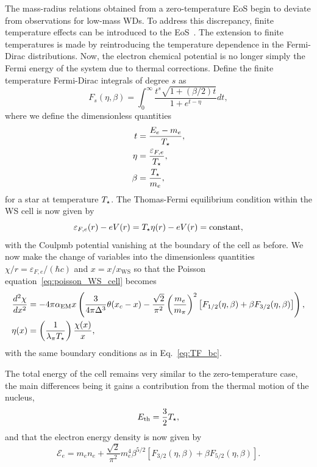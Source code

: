 The mass-radius relations obtained from a zero-temperature EoS begin to deviate from observations for low-mass WDs. 
To address this discrepancy, finite temperature effects can be introduced to the EoS~\cite{deCarvalho:2013rea_Relativisticfeynmanmetropolistellertreatment}. 
The extension to finite temperatures is made by reintroducing the temperature dependence in the Fermi-Dirac
distributions. Now, the electron chemical potential is no longer simply the Fermi energy of the system due to thermal corrections. Define the finite temperature Fermi-Dirac integrals of degree $s$ as
\begin{equation}
    F_s (\eta, \beta) = \int_0^\infty \frac{t^s\sqrt{1 + (\beta/2)t}}{1 + e^{t - \eta}}dt,
\end{equation}
where we define the dimensionless quantities 
\begin{align}
    t & = \frac{E_e - m_e}{T_\star},\\
    \eta & = \frac{\varepsilon_{F,e}}{T_\star},\\
    \beta & = \frac{T_\star}{m_e},
\end{align}
for a star at temperature $T_\star$. The Thomas-Fermi equilibrium condition within the WS cell is now given by 
\begin{equation}
    \varepsilon_{F,e}(r) - e V(r) = T_\star \eta(r) - e V(r) = \mathrm{constant},
\end{equation}
with the Coulpmb potential vanishing at the boundary of the cell as before. We now make the change of variables into the dimensionless quantities $\chi/r = \varepsilon_{F,e} / (\hbar c)$ and $x = x/x_\mathrm{WS}$ so that the Poisson equation~\ref{eq:poisson_WS_cell} becomes
\begin{align}
    \frac{d^2 \chi}{dx^2} &= -4 \pi \alpha_\mathrm{EM} x \left( \frac{3}{4\pi \Delta^3} \theta(x_c - x) - \frac{\sqrt{2}}{\pi^2} \left( \frac{m_e}{m_\pi} \right)^2\left[ F_{1/2}(\eta, \beta) + \beta  F_{3/2}(\eta, \beta) \right] \right),\\
    \eta(x) & = \left(\frac{1}{\lambda_\pi T_\star}\right)\frac{\chi(x)}{x},
\end{align}
with the same boundary conditions as in Eq.~\ref{eq:TF_bc}.

The total energy of the cell remains very similar to the zero-temperature case, the main differences being it gains a contribution from the thermal motion of the nucleus, 
\begin{equation}
    E_\mathrm{th} = \frac{3}{2}T_\star,
\end{equation} 
and that the electron energy density is now given by
\begin{equation}
    \mathcal{E}_e = m_e n_e + \frac{\sqrt{2}}{\pi^2} m_e^4 \beta^{5/2} \left[ F_{3/2}(\eta, \beta) + \beta F_{5/2}(\eta, \beta) \right].
\end{equation}

